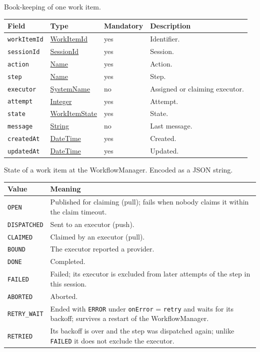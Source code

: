 \documentclass[a4paper]{arrowhead}
\newcommand{\mref}[1]{{\textcolor{ArrowheadPurple}{\hyperref[sec:model:#1]{#1}}}}
\newcommand{\pref}[1]{{\textcolor{ArrowheadGrey}{\hyperref[sec:model:primitives:#1]{#1}}}}
\begin{document}
Book-keeping of one work item.

{\small
\begin{longtable}{|p{3.7cm}|p{4.2cm}|p{1.6cm}|p{6.3cm}|}

\hline
\rowcolor{gray!33} Field & Type & Mandatory & Description \\ \hline
\endhead
\texttt{workItemId} & \pref{WorkItemId} & yes & Identifier. \\ \hline
\texttt{sessionId} & \pref{SessionId} & yes & Session. \\ \hline
\texttt{action} & \pref{Name} & yes & Action. \\ \hline
\texttt{step} & \pref{Name} & yes & Step. \\ \hline
\texttt{executor} & \pref{SystemName} & no & Assigned or claiming executor. \\ \hline
\texttt{attempt} & \pref{Integer} & yes & Attempt. \\ \hline
\texttt{state} & \mref{WorkItemState} & yes & State. \\ \hline
\texttt{message} & \pref{String} & no & Last message. \\ \hline
\texttt{createdAt} & \pref{DateTime} & yes & Created. \\ \hline
\texttt{updatedAt} & \pref{DateTime} & yes & Updated. \\ \hline
\end{longtable}
}

State of a work item at the WorkflowManager.
 Encoded as a JSON string.
{\small
\begin{longtable}{|p{3.9cm}|p{11.9cm}|}

\hline
\rowcolor{gray!33} Value & Meaning \\ \hline
\endhead
\texttt{OPEN} & Published for claiming (pull); fails when nobody claims it within the claim timeout. \\ \hline
\texttt{DISPATCHED} & Sent to an executor (push). \\ \hline
\texttt{CLAIMED} & Claimed by an executor (pull). \\ \hline
\texttt{BOUND} & The executor reported a provider. \\ \hline
\texttt{DONE} & Completed. \\ \hline
\texttt{FAILED} & Failed; its executor is excluded from later attempts of the step in this session. \\ \hline
\texttt{ABORTED} & Aborted. \\ \hline
\texttt{RETRY\_WAIT} & Ended with \texttt{ERROR} under \texttt{onError} = \texttt{retry} and waits for its backoff; survives a restart of the WorkflowManager. \\ \hline
\texttt{RETRIED} & Its backoff is over and the step was dispatched again; unlike \texttt{FAILED} it does not exclude the executor. \\ \hline
\end{longtable}
}
\end{document}
